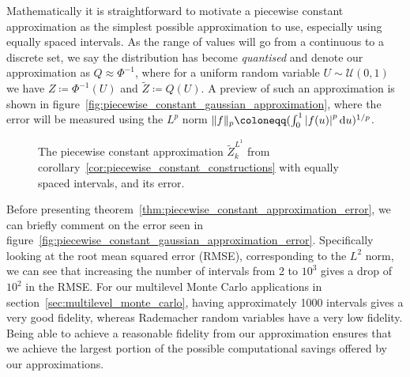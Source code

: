 \documentclass[manuscript,review]{acmart}
\begin{document}
Mathematically it is straightforward to motivate a piecewise constant approximation as the simplest possible approximation to use, especially using equally spaced intervals. As the range of values will go from a continuous to a discrete set, we say the distribution has become \emph{quantised} and denote our approximation as $ Q \approx \Phi^{-1} $, where for a uniform random variable $ U \sim \mathcal{U}(0, 1)$ we have $ Z \coloneqq \Phi^{-1}(U) $ and $ \widetilde{Z} \coloneqq Q(U) $. A preview of such an approximation is shown in figure~\ref{fig:piecewise_constant_gaussian_approximation}, where the error will be measured using the $ L^p $ norm $ \lVert f \rVert_p \coloneqq (\int_0^1 \abs{f(u)}^p \dd{u})^{1/p} $.

\begin{figure}[htb]
\centering

\hfil
{}\hfil
{}\hfil

\caption{The piecewise constant approximation $ \widetilde{Z}_k^{L^1} $ from corollary~\ref{cor:piecewise_constant_constructions} with equally spaced intervals, and its error.}
\label{fig:piecewise_constant_approximation}
\end{figure}

Before presenting theorem~\ref{thm:piecewise_constant_approximation_error}, we can briefly comment on the error seen in figure~\ref{fig:piecewise_constant_gaussian_approximation_error}. Specifically looking at the root mean squared error (RMSE), corresponding to the $ L^2 $ norm, we can see that increasing the number of intervals from 2 to $ 10^3 $ gives a drop of $ 10^2 $ in the RMSE. For our multilevel Monte Carlo applications in section~\ref{sec:multilevel_monte_carlo}, having approximately 1000 intervals gives a very good fidelity, whereas Rademacher random variables have a very low fidelity. Being able to achieve a reasonable fidelity from our approximation ensures that we achieve the largest portion of the possible computational savings offered by our approximations. 
\end{document}
